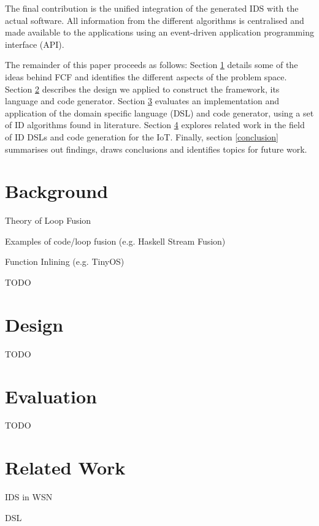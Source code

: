 \documentclass[conference]{IEEEtran}
\begin{document}
The final contribution is the unified integration of the generated IDS with the
actual software. All information from the different algorithms is centralised
and made available to the applications using an event-driven application
programming interface (API).

The remainder of this paper proceeds as follows: Section \ref{background}
details some of the ideas behind FCF and identifies the different aspects of
the problem space. Section \ref{design} describes the design we applied to
construct the framework, its language and code generator. Section
\ref{evaluation} evaluates an implementation and application of the domain
specific language (DSL) and code generator, using a set of ID algorithms found
in literature. Section \ref{related} explores related work in the field of ID
DSLs and code generation for the IoT. Finally, section \ref{conclusion}
summarises out findings, draws conclusions and identifies topics for future
work.

\section{Background}
\label{background}

Theory of Loop Fusion \cite{darte2000complexity}

Examples of code/loop fusion (e.g. Haskell Stream Fusion) \cite{coutts2007stream}

Function Inlining (e.g. TinyOS) \cite{gay2007software,gay2003nesc}

TODO

\section{Design}
\label{design}

TODO

\section{Evaluation}
\label{evaluation}

TODO

\section{Related Work}
\label{related}

IDS in WSN \cite{perrig2004security,mishra2004intrusion}

DSL \cite{fowler2010domain,mernik2005and}
\end{document}
